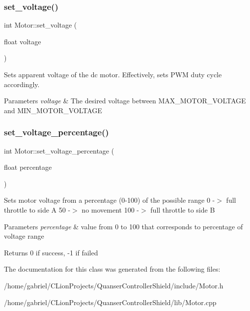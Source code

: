 \subsubsection{\texorpdfstring{set\+\_\+voltage()}{set\_voltage()}}
{\footnotesize\ttfamily int Motor\+::set\+\_\+voltage (\begin{DoxyParamCaption}\item[{float}]{voltage }\end{DoxyParamCaption})}

Sets apparent voltage of the dc motor. Effectively, sets P\+WM duty cycle accordingly. 
\begin{DoxyParams}{Parameters}
{\em voltage} & The desired voltage between M\+A\+X\+\_\+\+M\+O\+T\+O\+R\+\_\+\+V\+O\+L\+T\+A\+GE and M\+I\+N\+\_\+\+M\+O\+T\+O\+R\+\_\+\+V\+O\+L\+T\+A\+GE \\
\hline
\end{DoxyParams}
\mbox{\label{classMotor_a7fda59cead716e5cd5ce252741d3d47b}} 
\subsubsection{\texorpdfstring{set\+\_\+voltage\+\_\+percentage()}{set\_voltage\_percentage()}}
{\footnotesize\ttfamily int Motor\+::set\+\_\+voltage\+\_\+percentage (\begin{DoxyParamCaption}\item[{float}]{percentage }\end{DoxyParamCaption})}

Sets motor voltage from a percentage (0-\/100) of the possible range 0 -\/$>$ full throttle to side A 50 -\/$>$ no movement 100 -\/$>$ full throttle to side B 
\begin{DoxyParams}{Parameters}
{\em percentage} & value from 0 to 100 that corresponds to percentage of voltage range \\
\hline
\end{DoxyParams}
\begin{DoxyReturn}{Returns}
0 if success, -\/1 if failed 
\end{DoxyReturn}


The documentation for this class was generated from the following files\+:\begin{DoxyCompactItemize}
\item 
/home/gabriel/\+C\+Lion\+Projects/\+Quanser\+Controller\+Shield/include/Motor.\+h\item 
/home/gabriel/\+C\+Lion\+Projects/\+Quanser\+Controller\+Shield/lib/Motor.\+cpp\end{DoxyCompactItemize}
